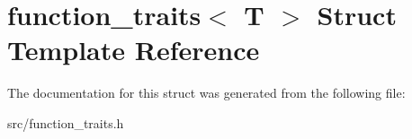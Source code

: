 \hypertarget{structfunction__traits}{\section{function\-\_\-traits$<$ T $>$ Struct Template Reference}
\label{structfunction__traits}
}


The documentation for this struct was generated from the following file\-:\begin{DoxyCompactItemize}
\item 
src/function\-\_\-traits.\-h\end{DoxyCompactItemize}
